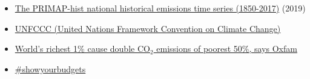 \documentclass[12pt]{article}
\begin{document}
\begin{itemize}
 \vspace{-.2cm} \item \href{https://dataservices.gfz-potsdam.de/pik/showshort.php?id=escidoc:4736895}{The PRIMAP-hist national historical emissions time series (1850-2017)} (2019)
 \vspace{-.2cm} \item \href{https://unfccc.int/}{UNFCCC (United Nations Framework Convention on Climate Change)} 
 \vspace{-.2cm} \item \href{https://www.theguardian.com/environment/2020/sep/21/worlds-richest-1-cause-double-co2-emissions-of-poorest-50-says-oxfam?utm_campaign=Carbon%20Brief%20Daily%20Briefing&utm_medium=email&utm_source=Revue%20newsletter}{World's richest 1\% cause double CO$_2$ emissions of poorest 50\%, says Oxfam} 
 \vspace{-.2cm} \item \href{https://www.showyourbudgets.org/de/?country=whole_world}{\#showyourbudgets} 
 \end{itemize}

 
\end{document}
